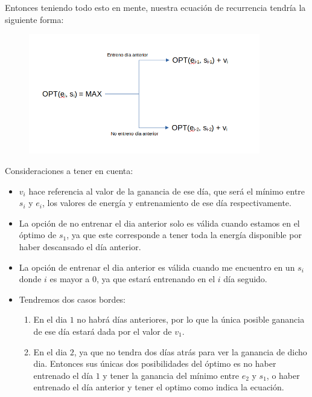 Entonces teniendo todo esto en mente, nuestra ecuación de recurrencia tendría la siguiente forma:

\begin{figure}[H]
    \centering
    \includegraphics[width=0.9\textwidth]{img/equation.png}
\end{figure}

Consideraciones a tener en cuenta:

\begin{itemize}
	\item $v_i$ hace referencia al valor de la ganancia de ese día, que será el mínimo entre $s_i$ y $e_i$, los valores de energía y entrenamiento de ese día respectivamente.
	\item La opción de no entrenar el dia anterior solo es válida cuando estamos en el óptimo de $s_1$, ya que este corresponde a tener toda la energía disponible por haber descansado el día anterior.
	\item La opción de entrenar el dia anterior es válida cuando me encuentro en un $s_i$ donde $i$ es mayor a 0, ya que estará entrenando en el $i$ día seguido.
	\item Tendremos dos casos bordes:
	\begin{enumerate}
    	\item En el dia $1$ no habrá días anteriores, por lo que la única posible ganancia de ese día estará dada por el valor de $v_1$.
    	\item En el dia $2$, ya que no tendra dos días atrás para ver la ganancia de dicho dia. Entonces sus únicas dos posibilidades del óptimo es no haber entrenado el día $1$ y tener la ganancia del mínimo entre $e_2$ y $s_1$, o haber entrenado el día anterior y tener el optimo como indica la ecuación.
	\end{enumerate}
\end{itemize}
